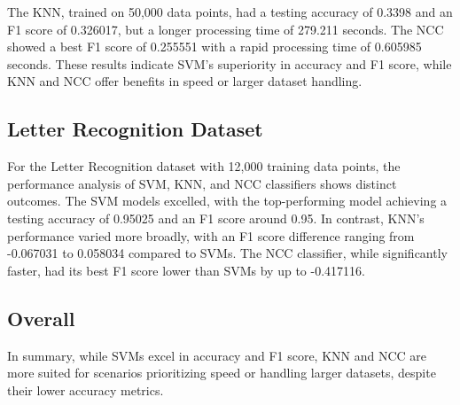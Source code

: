 \documentclass[conference]{IEEEtran}
\begin{document}
The KNN, trained on 50,000 data points, had a testing accuracy of 0.3398 and an F1 score of 0.326017, but a longer processing time of 279.211 seconds. The NCC showed a best F1 score of 0.255551 with a rapid processing time of 0.605985 seconds. These results indicate SVM's superiority in accuracy and F1 score, while KNN and NCC offer benefits in speed or larger dataset handling.

\subsection{Letter Recognition Dataset}
For the Letter Recognition dataset with 12,000 training data points, the performance analysis of SVM, KNN, and NCC classifiers shows distinct outcomes. The SVM models excelled, with the top-performing model achieving a testing accuracy of 0.95025 and an F1 score around 0.95. In contrast, KNN's performance varied more broadly, with an F1 score difference ranging from -0.067031 to 0.058034 compared to SVMs. The NCC classifier, while significantly faster, had its best F1 score lower than SVMs by up to -0.417116.

\subsection{Overall}
In summary, while SVMs excel in accuracy and F1 score, KNN and NCC are more suited for scenarios prioritizing speed or handling larger datasets, despite their lower accuracy metrics.
\end{document}
